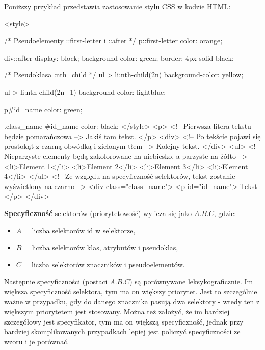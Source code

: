\begin{example}
    Poniższy przykład przedstawia zastosowanie stylu CSS w kodzie HTML:
    \begin{html}
        <style>
            
            /* Pseudoelementy ::first-letter i ::after */
            p::first-letter {
                color: orange;
            }
            
            div::after {
                display: block;
                background-color: green;
                border: 4px solid black;
            }
            
            /* Pseudoklasa :nth_child */
            ul > li:nth-child(2n) {
                background-color: yellow;
            }
            
            ul > li:nth-child(2n+1) {
                background-color: lightblue;
            }
            
            p#id_name { color: green; }
            
            .class_name #id_name { color: black; }
        </style> 
        <p>
            <!-- Pierwsza litera tekstu będzie pomarańczowa -->
            Jakiś tam tekst.
        </p>
        <div>
            <!-- Po tekście pojawi się prostokąt z czarną obwódką i zielonym tłem -->
            Kolejny tekst.
        </div>
        <ul>
            <!-- Nieparzyste elementy będą zakolorowane na niebiesko, a parzyste na żółto -->
            <li>Element 1</li>
            <li>Element 2</li>
            <li>Element 3</li>
            <li>Element 4</li>
        </ul>
        <!-- Ze względu na specyficzność selektorów, tekst zostanie wyświetlony na czarno -->
        <div class="class_name">
            <p id="id_name"> Tekst </p>
        </div>
    \end{html}
\end{example}

\textbf{Specyficzność} selektorów (priorytetowość) wylicza się jako $A.B.C$, gdzie:
\begin{itemize}
    \item $A$ = liczba selektorów id w selektorze,
    \item $B$ = liczba selektorów klas, atrybutów i pseudoklas,
    \item $C$ = liczba selektorów znaczników i pseudoelementów.
\end{itemize}

Następnie specyficzności (postaci $A.B.C$) są porównywane leksykograficznie. Im większa specyficzność selektora, tym ma on większy priorytet. Jest to szczególnie ważne w przypadku, gdy do danego znacznika pasują dwa selektory - wtedy ten z większym priorytetem jest stosowany. Można też założyć, że im bardziej szczegółowy jest specyfikator, tym ma on większą specyficzność, jednak przy bardziej skomplikowanych przypadkach lepiej jest policzyć specyficzności ze wzoru i je porównać.

